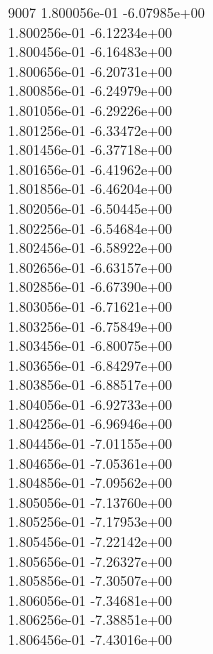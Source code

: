 9007	1.800056e-01	-6.07985e+00	\\ 	1.800256e-01	-6.12234e+00	\\ 	1.800456e-01	-6.16483e+00	\\ 	1.800656e-01	-6.20731e+00	\\ 	1.800856e-01	-6.24979e+00	\\ 	1.801056e-01	-6.29226e+00	\\ 	1.801256e-01	-6.33472e+00	\\ 	1.801456e-01	-6.37718e+00	\\ 	1.801656e-01	-6.41962e+00	\\ 	1.801856e-01	-6.46204e+00	\\ 	1.802056e-01	-6.50445e+00	\\ 	1.802256e-01	-6.54684e+00	\\ 	1.802456e-01	-6.58922e+00	\\ 	1.802656e-01	-6.63157e+00	\\ 	1.802856e-01	-6.67390e+00	\\ 	1.803056e-01	-6.71621e+00	\\ 	1.803256e-01	-6.75849e+00	\\ 	1.803456e-01	-6.80075e+00	\\ 	1.803656e-01	-6.84297e+00	\\ 	1.803856e-01	-6.88517e+00	\\ 	1.804056e-01	-6.92733e+00	\\ 	1.804256e-01	-6.96946e+00	\\ 	1.804456e-01	-7.01155e+00	\\ 	1.804656e-01	-7.05361e+00	\\ 	1.804856e-01	-7.09562e+00	\\ 	1.805056e-01	-7.13760e+00	\\ 	1.805256e-01	-7.17953e+00	\\ 	1.805456e-01	-7.22142e+00	\\ 	1.805656e-01	-7.26327e+00	\\ 	1.805856e-01	-7.30507e+00	\\ 	1.806056e-01	-7.34681e+00	\\ 	1.806256e-01	-7.38851e+00	\\ 	1.806456e-01	-7.43016e+00	\\ \hline
